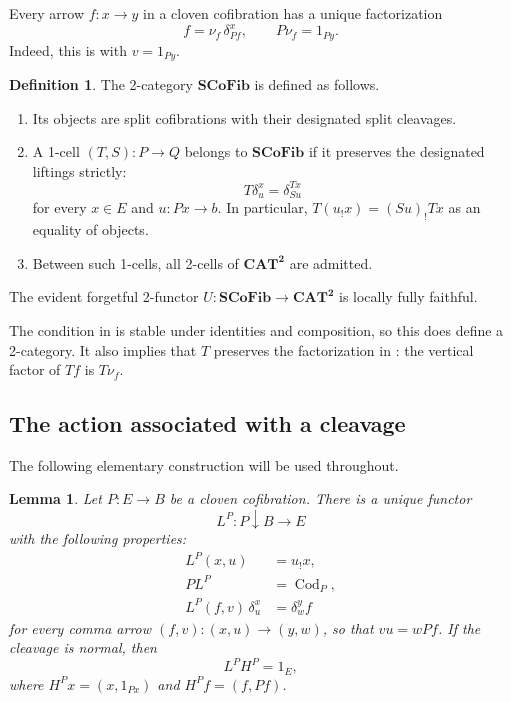 \documentclass[11pt]{article}
\theoremstyle{plain}
\newtheorem{lemma}[theorem]{Lemma}
\theoremstyle{definition}
\newtheorem{definition}[theorem]{Definition}
\theoremstyle{remark}
\newcommand{\CAT}{\mathbf{CAT}}
\newcommand{\SCoFib}{\mathbf{SCoFib}}
\newcommand{\Cod}{\operatorname{Cod}}
\numberwithin{equation}{section}
\begin{document}
Every arrow $f\colon x\to y$ in a cloven cofibration has a unique
factorization
\begin{equation}
f=\nu_f\,\delta^{x}_{Pf},
  \qquad
  P\nu_f=1_{Py}.
  \label{eq:cofib-factorization}
\end{equation}
Indeed, this is  with $v=1_{Py}$.

\begin{definition}\label{def:scofib}
The 2-category $\SCoFib$ is defined as follows.
\begin{enumerate}[label=\textup{(\roman*)},leftmargin=2.2em]
\item Its objects are split cofibrations with their designated split
      cleavages.
\item A 1-cell $(T,S)\colon P\to Q$ belongs to $\SCoFib$ if it
      preserves the designated liftings strictly:
      \begin{equation}
        T\delta^{x}_{u}=\delta^{Tx}_{Su}
        \label{eq:cleavage-preservation}
\end{equation}
      for every $x\in E$ and $u\colon Px\to b$.  In particular,
      $T(u_{!}x)=(Su)_{!}Tx$ as an equality of objects.
\item Between such 1-cells, all 2-cells of $\CAT^{\mathbf 2}$ are
      admitted.
\end{enumerate}
The evident forgetful 2-functor
$U\colon\SCoFib\to\CAT^{\mathbf 2}$ is locally fully faithful.
\end{definition}

The condition in  is stable under
identities and composition, so this does define a 2-category.  It also
implies that $T$ preserves the factorization in
:
the vertical factor of $Tf$ is $T\nu_f$.

\subsection{The action associated with a cleavage}

The following elementary construction will be used throughout.

\begin{lemma}\label{lem:action-from-cleavage}
Let $P\colon E\to B$ be a cloven cofibration.  There is a unique
functor
\begin{equation*}
L^{P}\colon P\!\downarrow\!B\longrightarrow E
\end{equation*}
with the following properties:
\begin{align*}
  L^{P}(x,u)&=u_{!}x,\\
  P L^{P}&=\Cod_{P},\\
  L^{P}(f,v)\,\delta^{x}_{u}&=\delta^{y}_{w}f
\end{align*}
for every comma arrow
$(f,v)\colon(x,u)\to(y,w)$, so that $vu=wPf$.
If the cleavage is normal, then
\begin{equation}
L^{P}H^{P}=1_E,
  \label{eq:LH}
\end{equation}
where $H^{P}x=(x,1_{Px})$ and
$H^{P}f=(f,Pf)$.
\end{lemma}
\end{document}

